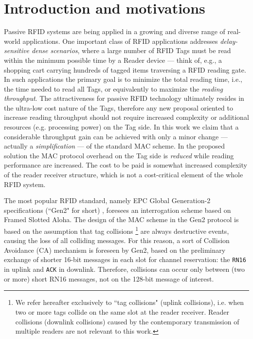 \documentclass[12pt,draftcls,onecolumn]{IEEEtran}
\begin{document}
\section{Introduction and motivations}\label{sec:intro}
{Passive RFID systems are being applied in a growing and diverse range of real-world applications}.
One important class of RFID applications addresses   \emph{delay-sensitive dense scenarios}, where a large number of RFID Tags must be read within the minimum possible time by a Reader device --- think of, e.g., a shopping cart carrying hundreds of tagged items traversing a RFID reading gate.
In such applications the primary goal is to minimize the total reading time, i.e., the time needed to read all Tags, or equivalently to maximize the \emph{reading throughput}.
The attractiveness for passive RFID technology ultimately resides in the ultra-low cost nature of the Tags, therefore any new proposal oriented to increase reading throughput should not require increased complexity or additional resources (e.g. processing power) on the Tag side.
In this work we claim that a considerable throughput gain can be achieved with only a minor change --- actually a \emph{simplification} --- of the standard MAC scheme.
In the proposed solution the MAC protocol overhead on the Tag side is \emph{reduced} while reading performance are increased.  The cost to be paid is somewhat increased complexity of the reader receiver structure, which is not a cost-critical element of the whole RFID system.


The most popular RFID standard, namely EPC Global Generation-2 specifications (``Gen2" for short) \cite{gen2}, foresees an interrogation scheme based on Framed Slotted Aloha.
The design of the MAC scheme in the Gen2 protocol is based on the assumption that tag collisions \footnote{We refer hereafter exclusively to ``tag collisions" (uplink collisions), i.e.  when two or more tags collide on the same slot at the reader receiver. Reader collisions (downlink collisions) caused by the contemporary transmission of multiple readers are not relevant to this work.}
 are always destructive events, causing the loss of all colliding messages. For this reason, a sort of Collision Avoidance (CA) mechanism is foreseen by Gen2, based on the preliminary exchange of shorter 16-bit messages in each slot for channel reservation: the \texttt{RN16} in uplink and \texttt{ACK} in downlink. Therefore, collisions can occur only between (two or more) short RN16 messages, not on the 128-bit message of interest.
\end{document}
